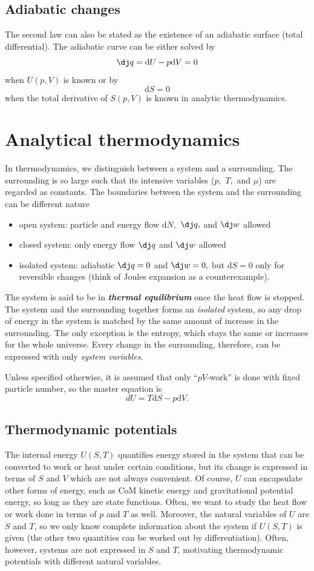 \documentclass{article}
\theoremstyle{nonumberplain}
\begin{document}
\subsection{Adiabatic changes}
The second law can also be stated as the existence of an adiabatic surface (total differential). The adiabatic curve can be either solved by 
\[
    \mathrm{\dj} q = \mathrm{d} U - p \mathrm{d} V = 0 
\]
when $U(p, V)$ is known or by 
\[
    \mathrm{d} S = 0
\]
when the total derivative of $S(p,V)$ is known in analytic thermodynamics.
\section{Analytical thermodynamics}
In thermodynamics, we distinguish between a system and a surrounding. The surrounding is so large such that its intensive variables ($p,$ $T,$ and $\mu $) are regarded as constants. The boundaries between the system and the surrounding can be different nature 
\begin{itemize}
    \item open system: particle and energy flow $\mathrm{d} N,$ $\mathrm{\dj}q,$ and $\mathrm{\dj}w $ allowed
    \item closed system: only energy flow $\mathrm{\dj}q $ and $\mathrm{\dj}w $ allowed 
    \item isolated system: adiabatic $\mathrm{\dj} q = 0$ and $\mathrm{\dj}w  =0,$ but $\mathrm{d} S = 0$ only for reversible changes (think of Joules expansion as a counterexample).
\end{itemize}
The system is said to be in \textit{\textbf{thermal equilibrium}} once the heat flow is stopped. The system and the surrounding together forms an \textit{isolated} system, so any drop of energy in the system is matched by the same amount of increase in the surrounding. The only exception is the entropy, which stays the same or increases for the whole universe. Every change in the surrounding, therefore, can be expressed with only \textit{system variables.}

Unless specified otherwise, it is assumed that only ``$pV$-work'' is done with fixed particle number, so the master equation is 
\[
    \boxed{dU = T \mathrm{d} S - p \mathrm{d} V.} 
\]
\subsection{Thermodynamic potentials}
The internal energy $U(S,T)$ quantifies energy stored in the system that can be converted to work or heat under certain conditions, but its change is expressed in terms of $S$ and $V$ which are not always convenient. Of course, $U$ can encapsulate other forms of energy, such as CoM kinetic energy and gravitational potential energy, so long as they are state functions. Often, we want to study the heat flow or work done in terms of $p$ and $T$ as well. Moreover, the natural variables of $U$ are $S$ and $T$, so we only know complete information about the system if $U(S,T)$ is given (the other two quantities can be worked out by differentiation). Often, however, systems are not expressed in $S$ and $T$, motivating thermodynamic potentials with different natural variables. 
\end{document}
